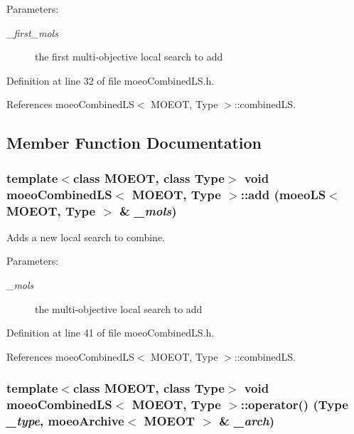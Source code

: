 \begin{Desc}
\item[Parameters:]
\begin{description}
\item[{\em \_\-first\_\-mols}]the first multi-objective local search to add \end{description}
\end{Desc}


Definition at line 32 of file moeo\-Combined\-LS.h.

References moeo\-Combined\-LS$<$ MOEOT, Type $>$::combined\-LS.

\subsection{Member Function Documentation}
\subsubsection{\setlength{\rightskip}{0pt plus 5cm}template$<$class MOEOT, class Type$>$ void {\bf moeo\-Combined\-LS}$<$ MOEOT, Type $>$::add ({\bf moeo\-LS}$<$ MOEOT, Type $>$ \& {\em \_\-mols})\hspace{0.3cm}{\tt  [inline]}}\label{classmoeoCombinedLS_1637b4dcf2dd694cc9ffbad605b2bf13}


Adds a new local search to combine. 

\begin{Desc}
\item[Parameters:]
\begin{description}
\item[{\em \_\-mols}]the multi-objective local search to add \end{description}
\end{Desc}


Definition at line 41 of file moeo\-Combined\-LS.h.

References moeo\-Combined\-LS$<$ MOEOT, Type $>$::combined\-LS.
\subsubsection{\setlength{\rightskip}{0pt plus 5cm}template$<$class MOEOT, class Type$>$ void {\bf moeo\-Combined\-LS}$<$ MOEOT, Type $>$::operator() (Type {\em \_\-type}, {\bf moeo\-Archive}$<$ MOEOT $>$ \& {\em \_\-arch})\hspace{0.3cm}{\tt  [inline, virtual]}}\label{classmoeoCombinedLS_634d7fa3092fe8f88a1b54cacfdc35fd}


